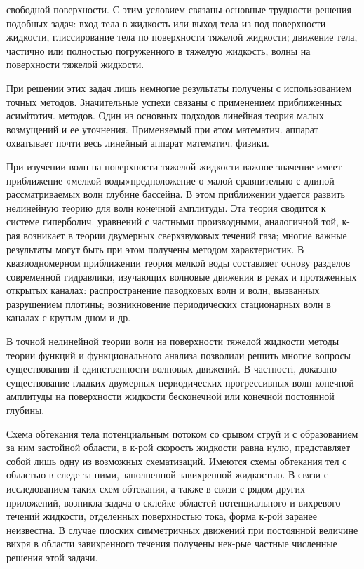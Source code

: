 \documentclass[10pt]{article}
\begin{document}
свободной поверхности. С этим условием связаны основные трудности решения подобных задач: вход тела в жидкость или выход тела из-под поверхности жидкости, глиссирование тела по поверхности тяжелой жидкости; движение тела, частично или полностью погруженного в тяжелую жидкость, волны на поверхности тяжелой жидкости.



При решении этих задач лишь немногие результаты получены с использованием точных методов. Значительные успехи связаны с применением приближенных асимітотич. методов. Один из основных подходов линейная теория малых возмущений и ее уточнения. Применяемый при әтом математич. аппарат охватывает почти весь линейный аппарат математич. физики.



При изучении волн на поверхности тяжелой жидкости важное значение имеет приближение «мелкой воды»предположение о малой сравнительно с длиной рассматриваемых волн глубине бассейна. В этом приближении удается развить нелинейную теорию для волн конечной амплитуды. Эта теория сводится к системе гиперболич. уравнений с частными производными, аналогичной той, к-рая возникает в теории двумерных сверхзвуковых течений газа; многие важные результаты могут быть при этом получены методом характеристик. В квазиодномерном приближении теория мелкой воды составляет основу разделов современной гидравлики, изучающих волновые движения в реках и протяженных открытых каналах: распространение паводковых волн и волн, вызванных разрушением плотины; возникновение периодических стационарных волн в каналах с крутым дном и др.



В точной нелинейной теории волн на поверхности тяжелой жидкости методы теории функций и функционального анализа позволили решить многие вопросы существования іІ единственности волновых движений. В частності, доказано существование гладких двумерных периодических прогрессивных волн конечной амплитуды на поверхности жидкости бесконечной или конечной постоянной глубины.



Схема обтекания тела потенциальным потоком со срывом струй и с образованием за ним застойной области, в к-рой скорость жидкости равна нулю, представляет собой лишь одну из возможных схематизаций. Имеются схемы обтекания тел с областью в следе за ними, заполненной завихренной жидкостью. В связи с исследованием таких схем обтекания, а также в связи с рядом других приложений, возникла задача о склейке областей потенциального и вихревого течений жидкости, отделенных поверхностью тока, форма к-рой заранее неизвестна. В случае плоских симметричных движений при постоянной величине вихря в области завихренного течения получены нек-рые частные численные решения этой задачи.
\end{document}
